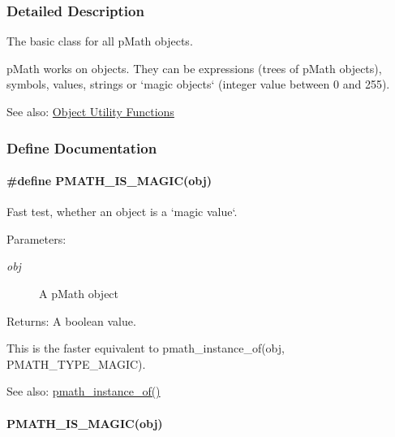 \subsubsection{Detailed Description}
The basic class for all pMath objects. 

pMath works on objects. They can be expressions (trees of pMath objects), symbols, values, strings or `magic objects` (integer value between 0 and 255).

\begin{Desc}
\item[See also:]\hyperlink{group__helpers}{Object Utility Functions} \end{Desc}


\subsubsection{Define Documentation}
\hypertarget{group__objects_g6251ebcdaf2f71e5db906a65a8efa621}{
\paragraph[{PMATH\_\-IS\_\-MAGIC}]{\setlength{\rightskip}{0pt plus 5cm}\#define PMATH\_\-IS\_\-MAGIC(obj)}\hfill}
\label{group__objects_g6251ebcdaf2f71e5db906a65a8efa621}


Fast test, whether an object is a `magic value`. 

\begin{Desc}
\item[Parameters:]
\begin{description}
\item[{\em obj}]A pMath object \end{description}
\end{Desc}
\begin{Desc}
\item[Returns:]A boolean value.\end{Desc}
This is the faster equivalent to pmath\_\-instance\_\-of(obj, PMATH\_\-TYPE\_\-MAGIC).

\begin{Desc}
\item[See also:]\hyperlink{classpmath__t_0bd527f1ec2db8f1eba58e1fd84babbc}{pmath\_\-instance\_\-of()} \end{Desc}
\hypertarget{group__objects_gfa4048bca71f5022d1fb979a5b930a11}{
\paragraph[{PMATH\_\-IS\_\-MAGIC}]{\setlength{\rightskip}{0pt plus 5cm}PMATH\_\-IS\_\-MAGIC(obj)}\hfill}
\label{group__objects_gfa4048bca71f5022d1fb979a5b930a11}


